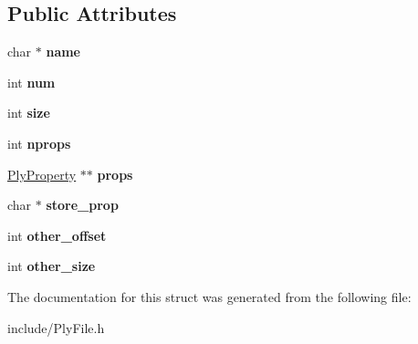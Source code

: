\subsection*{Public Attributes}
\begin{DoxyCompactItemize}
\item 
\hypertarget{structPlyElement_a851bfdee0489e67d5105d7f947dc7e35}{char $\ast$ {\bfseries name}}\label{structPlyElement_a851bfdee0489e67d5105d7f947dc7e35}

\item 
\hypertarget{structPlyElement_a3975c8d9bdd3b4435bca2cb6f7e99733}{int {\bfseries num}}\label{structPlyElement_a3975c8d9bdd3b4435bca2cb6f7e99733}

\item 
\hypertarget{structPlyElement_ab4a94646827e6b91a9778a4fea45a051}{int {\bfseries size}}\label{structPlyElement_ab4a94646827e6b91a9778a4fea45a051}

\item 
\hypertarget{structPlyElement_af8251c4b09b4292a0529a7c7acfe7771}{int {\bfseries nprops}}\label{structPlyElement_af8251c4b09b4292a0529a7c7acfe7771}

\item 
\hypertarget{structPlyElement_abd25d464578a898680daea44e24fbb21}{\hyperlink{structPlyProperty}{Ply\-Property} $\ast$$\ast$ {\bfseries props}}\label{structPlyElement_abd25d464578a898680daea44e24fbb21}

\item 
\hypertarget{structPlyElement_aa0e220908f47f0c2c3a5bcee0ee01d99}{char $\ast$ {\bfseries store\-\_\-prop}}\label{structPlyElement_aa0e220908f47f0c2c3a5bcee0ee01d99}

\item 
\hypertarget{structPlyElement_a3711e7f51c082da6639ac3239ee2444a}{int {\bfseries other\-\_\-offset}}\label{structPlyElement_a3711e7f51c082da6639ac3239ee2444a}

\item 
\hypertarget{structPlyElement_a4ec699438f485c7ecca7cb7d623e4e74}{int {\bfseries other\-\_\-size}}\label{structPlyElement_a4ec699438f485c7ecca7cb7d623e4e74}

\end{DoxyCompactItemize}


The documentation for this struct was generated from the following file\-:\begin{DoxyCompactItemize}
\item 
include/Ply\-File.\-h\end{DoxyCompactItemize}
